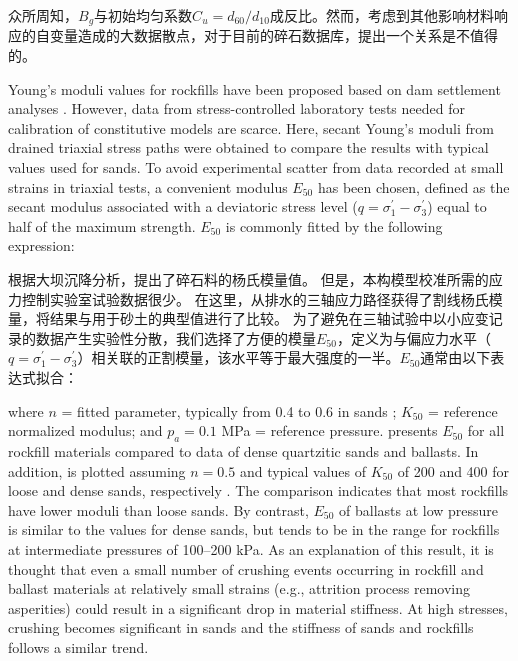 \begin{ParaColumn}
    \switchcolumn

    众所周知，$B_g$与初始均匀系数$C_u=d_{60}/d_{10}$成反比\citep{Hardin19851177,Ovalle20162383}。然而，考虑到其他影响材料响应的自变量造成的大数据散点，对于目前的碎石数据库，提出一个关系是不值得的。


    Young’s moduli values for rockfills have been proposed based on dam settlement analyses \citep{Hunter2003909,Kermani2018}. However, data from stress-controlled laboratory tests needed for calibration of constitutive models are scarce. Here, secant Young’s moduli from drained triaxial stress paths were obtained to compare the results with typical values used for sands. To avoid experimental scatter from data recorded at small strains in triaxial tests, a convenient modulus $E_{50}$ has been chosen, defined as the secant modulus associated with a deviatoric stress level ($q=\sigma_1^\prime-\sigma_3^\prime$) equal to half of the maximum strength. $E_{50}$ is commonly fitted by the following expression:

    \switchcolumn

    根据大坝沉降分析，提出了碎石料的杨氏模量值\citep{Hunter2003909,Kermani2018}。 但是，本构模型校准所需的应力控制实验室试验数据很少。 在这里，从排水的三轴应力路径获得了割线杨氏模量，将结果与用于砂土的典型值进行了比较。 为了避免在三轴试验中以小应变记录的数据产生实验性分散，我们选择了方便的模量$E_{50}$，定义为与偏应力水平（$q=\sigma_1^\prime-\sigma_3^\prime$）相关联的正割模量，该水平等于最大强度的一半。$E_{50}$通常由以下表达式拟合：


    \switchcolumn*

    \noindent
    where $n$ = fitted parameter, typically from 0.4 to 0.6 in sands \citep{Schanz1998383,Schanz1999281}; $K_{50}$ = reference normalized modulus; and $p_a=0.1$ MPa = reference pressure.  presents $E_{50}$ for all rockfill materials compared to data of dense quartzitic sands and ballasts. In addition,  is plotted assuming $n=0.5$ and typical values of $K_{50}$ of 200 and 400 for loose and dense sands, respectively \citep{Schanz1998383}. The comparison indicates that most rockfills have lower moduli than loose sands. By contrast, $E_{50}$ of ballasts at low pressure is similar to the values for dense sands, but tends to be in the range for rockfills at intermediate pressures of 100–200 kPa. As an explanation of this result, it is thought that even a small number of crushing events occurring in rockfill and ballast materials at relatively small strains (e.g., attrition process removing asperities) could result in a significant drop in material stiffness. At high stresses, crushing becomes significant in sands and the stiffness of sands and rockfills follows a similar trend.


\end{ParaColumn}
